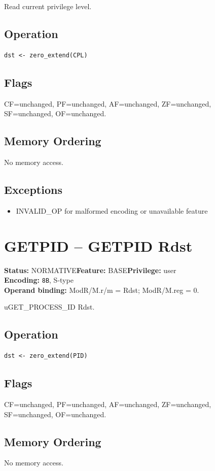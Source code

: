 \documentclass[10pt]{article}
\begin{document}
Read current privilege level.

\subsection*{Operation}
\begin{lstlisting}
dst <- zero_extend(CPL)
\end{lstlisting}
\subsection*{Flags}
CF=unchanged, PF=unchanged, AF=unchanged, ZF=unchanged, SF=unchanged, OF=unchanged.
\subsection*{Memory Ordering}
No memory access.
\subsection*{Exceptions}
\begin{itemize}
\item INVALID\_OP for malformed encoding or unavailable feature
\end{itemize}
\clearpage

\section{GETPID -- GETPID Rdst}
\textbf{Status:} NORMATIVE\quad \textbf{Feature:} BASE\quad \textbf{Privilege:} user\\
\textbf{Encoding:} \texttt{8B}, S-type\\
\textbf{Operand binding:} ModR/M.r/m = Rdst; ModR/M.reg = 0.

uGET\_PROCESS\_ID Rdst.

\subsection*{Operation}
\begin{lstlisting}
dst <- zero_extend(PID)
\end{lstlisting}
\subsection*{Flags}
CF=unchanged, PF=unchanged, AF=unchanged, ZF=unchanged, SF=unchanged, OF=unchanged.
\subsection*{Memory Ordering}
No memory access.
\end{document}
